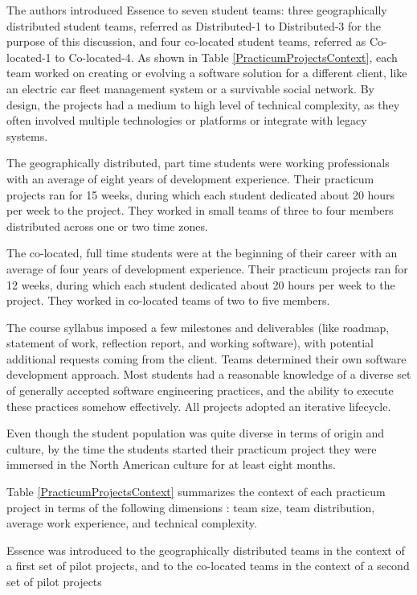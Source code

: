 The authors introduced Essence to seven student teams: three geographically distributed student teams, referred as Distributed-1 to Distributed-3 for the purpose of this discussion, and four co-located student teams, referred as Co-located-1 to Co-located-4. As shown in Table \ref{PracticumProjectsContext}, each team worked on creating or evolving a software solution for a different client, like an electric car fleet management system or a survivable social network. By design, the projects had a medium to high level of technical complexity, as they often involved multiple technologies or platforms or integrate with legacy systems.

The geographically distributed, part time students were working professionals with an average of eight years of development experience. Their practicum projects ran for 15 weeks, during which each student dedicated about 20 hours per week to the project. They worked in small teams of three to four members distributed across one or two time zones.

The co-located, full time students were at the beginning of their career with an average of four years of development experience. Their practicum projects ran for 12 weeks, during which each student dedicated about 20 hours per week to the project. They worked in co-located teams of two to five members.

The course syllabus imposed a few milestones and deliverables (like roadmap, statement of work, reflection report, and working software), with potential additional requests coming from the client. Teams determined their own software development approach. Most students had a reasonable knowledge of a diverse set of generally accepted software engineering practices, and the ability to execute these practices somehow effectively. All projects adopted an iterative lifecycle.

Even though the student population was quite diverse in terms of origin and culture, by the time the students started their practicum project they were immersed in the North American culture for at least eight months.

Table \ref{PracticumProjectsContext} summarizes the context of each practicum project in terms of the following dimensions \cite{AmblerDAD, BoehmBalancingAgilityAndDiscipline, KruchtenContextualizingAgile}: team size, team distribution, average work experience, and technical complexity.

Essence was introduced to the geographically distributed teams in the context of a first set of pilot projects, and to the co-located teams in the context of a second set of pilot projects

